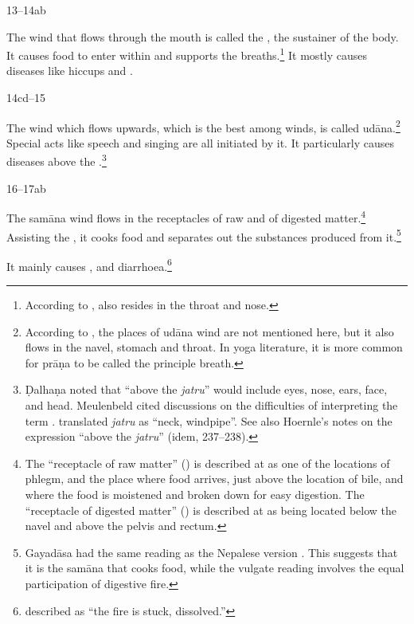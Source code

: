 \begin{translation}
\item[13--14ab] 

	The wind that flows through the mouth is called the , the sustainer of the body.  It causes food to enter within and
	supports the breaths.\footnote{According to
	,  also resides in the throat and
	nose.} It mostly causes diseases like hiccups and .



\item[14cd--15] 

	The wind which flows upwards, which is the best among winds, is called
	udāna.\footnote{According to , the places of
	udāna wind are not mentioned here, but it also flows in the navel,
	stomach and throat.  In yoga literature, it is more common for prāṇa to
	be called the principle breath.} Special acts like speech and singing
	are all initiated by it. It particularly causes diseases above the
	.\footnote{Ḍalhaṇa noted that “above the \emph{jatru}”
	would include eyes, nose, ears, face, and head.  Meulenbeld cited
	discussions on the difficulties of interpreting the term 
	\citep[465]{meul-1974}.  \citet[\S\S62, 98]{hoer-1907} translated
	\emph{jatru} as “neck, windpipe”. See also Hoernle's notes on the
	expression “above the \emph{jatru}” (idem, 237--238).}

\item [16--17ab]

	The samāna wind flows in the receptacles of raw and of digested
	matter.\footnote{The “receptacle of raw matter” () is
	described at  as one of the locations of phlegm, and
	 the place where food arrives, just above the location of bile, and
	 where the food is moistened and broken down for easy digestion.  The
	“receptacle of digested matter” () is described at
	 as being located below the navel and above the pelvis
	and rectum.} Assisting the , it cooks food and
	 separates out the substances produced from it.\footnote{Gayadāsa had
	 the same reading  as the Nepalese version \citep[260,
	 note~1 and the text of the \emph{Nyācacandrikā}]{vulgate}.  This
	 suggests that it is the samāna that cooks food, while the vulgate
	 reading involves the equal participation of digestive fire.}

	It mainly causes ,
	 and
	diarrhoea.\footnote{ described  as
	“the fire is stuck, dissolved.”}




\end{translation}
